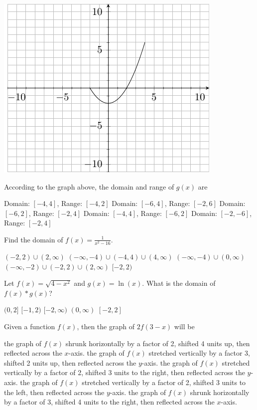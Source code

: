 \documentclass[11pt]{article}
\begin{document}
\begin{questions}
\begin{multiplechoice}{5}
\begin{minipage}{\linewidth}%
\centering
\makebox[\linewidth]{}
\includegraphics{exam1graph2.pdf}
\label{graph2exam1}%
\end{minipage}
According to the graph above, the domain and range of $g(x)$ are
\begin{answers}{2}
\ans Domain: $[-4,4]$, Range: $[-4,2]$
\ans Domain: $[-6,4]$, Range: $[-2,6]$
\ans Domain: $[-6,2]$, Range: $[-2,4]$
\ans Domain: $[-4,4]$, Range: $[-6,2]$
\ans Domain: $[-2,-6]$, Range: $[-2,4]$
\end{answers}

\question Find the domain of $f(x) = \frac{1}{x^2 - 16}$.
\begin{answers}{2}
\ans $(-2,2) \cup (2, \infty)$
\ans $(-\infty, -4) \cup (-4,4) \cup (4, \infty) $
\ans  $(-\infty, -4) \cup (0, \infty)$
\ans  $(-\infty, -2) \cup (-2,2) \cup (2, \infty)$
\ans $[-2,2)$
\end{answers}


\question Let $f(x) = \sqrt{4-x^2}$ and $g(x)=\ln(x)$.  What is the domain of $f(x)*g(x)$?
\begin{answers}{2}
\ans $(0,2]$
\ans $[-1,2)$
\ans $[-2,\infty)$
\ans $(0,\infty)$
\ans $[-2,2]$
\end{answers}

\nextpage

\question Given a function $f(x)$, then the graph of $2f\left(3 - x\right)$ will be
\begin{answers}{2}
\ans the graph of $f(x)$ shrunk horizontally by a factor of 2, shifted 4 units up, then reflected across the $x$-axis.
\ans the graph of $f(x)$ stretched vertically by a factor 3, shifted 2 units up, then reflected across the $y$-axis.
\ans the graph of $f(x)$ stretched vertically by a factor of 2, shifted 3 units to the right, then reflected across the $y$-axis.
\ans the graph of $f(x)$ stretched vertically by a factor of 2, shifted 3 units to the left, then reflected across the $y$-axis.
\ans the graph of $f(x)$ shrunk horizontally by a factor of 3, shifted 4 units to the right, then reflected across the $x$-axis.
\end{answers}




\end{multiplechoice}
\end{questions}
\end{document}
